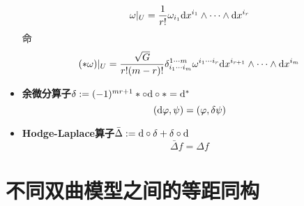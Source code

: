 \documentclass{book}
\newcommand{\md}{{\rm d}}
\begin{document}
\begin{itemize}
\begin{equation*}
                \omega|_U=\frac{1}{r!}\omega_{i_1}\md{x^{i_1}}\wedge\cdots\wedge\md{x^{i_r}}
            \end{equation*}
            命
            \begin{equation*}
                (*\omega)|_U=\frac{\sqrt{G}}{r!(m-r)!}\delta^{1\cdots m}_{i_1\cdots i_m}\omega^{i_1\cdots i_r}\md{x^{i_{r+1}}}\wedge\cdots\wedge\md{x^{i_m}}
            \end{equation*}
            \item \textbf{余微分算子}$\delta := (-1)^{mr+1}*\circ\md\circ*=\md^*$
            \begin{equation*}
                (\md{\varphi},\psi)=(\varphi, \delta\psi)
            \end{equation*}
            \item \textbf{Hodge-Laplace算子}$\bar{\Delta}:=\md\circ\delta+\delta\circ\md$
            \begin{equation*}
                \bar{\Delta}f=\Delta f
            \end{equation*}
        \end{itemize}
    \section{不同双曲模型之间的等距同构}
\end{document}
